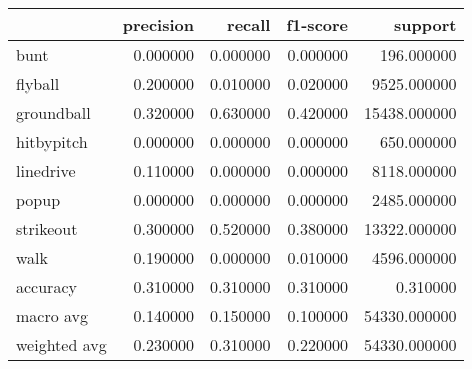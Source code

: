 \begin{tabular}{lrrrr}
\toprule
 & precision & recall & f1-score & support \\
\midrule
bunt & 0.000000 & 0.000000 & 0.000000 & 196.000000 \\
flyball & 0.200000 & 0.010000 & 0.020000 & 9525.000000 \\
groundball & 0.320000 & 0.630000 & 0.420000 & 15438.000000 \\
hitbypitch & 0.000000 & 0.000000 & 0.000000 & 650.000000 \\
linedrive & 0.110000 & 0.000000 & 0.000000 & 8118.000000 \\
popup & 0.000000 & 0.000000 & 0.000000 & 2485.000000 \\
strikeout & 0.300000 & 0.520000 & 0.380000 & 13322.000000 \\
walk & 0.190000 & 0.000000 & 0.010000 & 4596.000000 \\
accuracy & 0.310000 & 0.310000 & 0.310000 & 0.310000 \\
macro avg & 0.140000 & 0.150000 & 0.100000 & 54330.000000 \\
weighted avg & 0.230000 & 0.310000 & 0.220000 & 54330.000000 \\
\bottomrule
\end{tabular}
